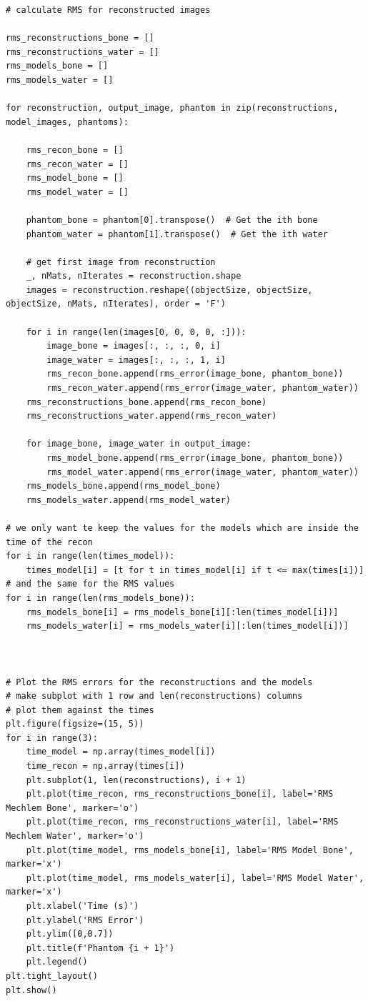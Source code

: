 \begin{verbatim}
# calculate RMS for reconstructed images

rms_reconstructions_bone = []
rms_reconstructions_water = []
rms_models_bone = []
rms_models_water = []

for reconstruction, output_image, phantom in zip(reconstructions, model_images, phantoms): 

    rms_recon_bone = []
    rms_recon_water = []
    rms_model_bone = []
    rms_model_water = []

    phantom_bone = phantom[0].transpose()  # Get the ith bone
    phantom_water = phantom[1].transpose()  # Get the ith water

    # get first image from reconstruction
    _, nMats, nIterates = reconstruction.shape
    images = reconstruction.reshape((objectSize, objectSize, objectSize, nMats, nIterates), order = 'F')

    for i in range(len(images[0, 0, 0, 0, :])):
        image_bone = images[:, :, :, 0, i]
        image_water = images[:, :, :, 1, i]
        rms_recon_bone.append(rms_error(image_bone, phantom_bone))
        rms_recon_water.append(rms_error(image_water, phantom_water))
    rms_reconstructions_bone.append(rms_recon_bone)
    rms_reconstructions_water.append(rms_recon_water)

    for image_bone, image_water in output_image:
        rms_model_bone.append(rms_error(image_bone, phantom_bone))
        rms_model_water.append(rms_error(image_water, phantom_water))
    rms_models_bone.append(rms_model_bone)
    rms_models_water.append(rms_model_water)

# we only want te keep the values for the models which are inside the time of the recon
for i in range(len(times_model)):
    times_model[i] = [t for t in times_model[i] if t <= max(times[i])]
# and the same for the RMS values
for i in range(len(rms_models_bone)):
    rms_models_bone[i] = rms_models_bone[i][:len(times_model[i])]
    rms_models_water[i] = rms_models_water[i][:len(times_model[i])]



# Plot the RMS errors for the reconstructions and the models
# make subplot with 1 row and len(reconstructions) columns
# plot them against the times
plt.figure(figsize=(15, 5))
for i in range(3):
    time_model = np.array(times_model[i])
    time_recon = np.array(times[i])
    plt.subplot(1, len(reconstructions), i + 1)
    plt.plot(time_recon, rms_reconstructions_bone[i], label='RMS Mechlem Bone', marker='o')
    plt.plot(time_recon, rms_reconstructions_water[i], label='RMS Mechlem Water', marker='o')
    plt.plot(time_model, rms_models_bone[i], label='RMS Model Bone', marker='x')
    plt.plot(time_model, rms_models_water[i], label='RMS Model Water', marker='x')
    plt.xlabel('Time (s)')
    plt.ylabel('RMS Error')
    plt.ylim([0,0.7])
    plt.title(f'Phantom {i + 1}')
    plt.legend()
plt.tight_layout()
plt.show()
\end{verbatim}

